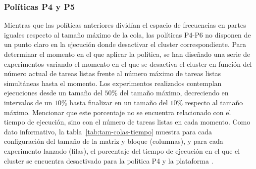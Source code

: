 \subsubsection{Políticas P4 y P5}
Mientras que las políticas anteriores dividían el espacio de frecuencias en
partes iguales respecto al tamaño máximo de la cola, las políticas P4-P6 no
disponen de un punto claro en la ejecución donde desactivar el cluster
correspondiente. Para determinar el momento en el que aplicar la política,
se han diseñado una serie de experimentos variando el momento en el que se
desactiva el cluster en función del número actual de tareas listas frente
al número máximo de tareas listas simultáneas hasta el momento. Los
experimentos realizados contemplan ejecuciones desde un tamaño del $50\%$
del tamaño máximo, decreciendo en intervalos de un $10\%$ hasta finalizar
en un tamaño del $10\%$ respecto al tamaño máximo. Mencionar que este
porcentaje no se encuentra relacionado con el tiempo de ejecución, sino con
el número de tareas listas en cada momento. Como dato informativo, la
tabla~\ref{tab:tam-colas-tiempo} muestra para cada configuración del tamaño
de la matriz y bloque (columnas), y para cada experimento lanzado (filas),
el porcentaje del tiempo de ejecución en el que el cluster se encuentra
desactivado para la política P4 y la plataforma \juno.\\


